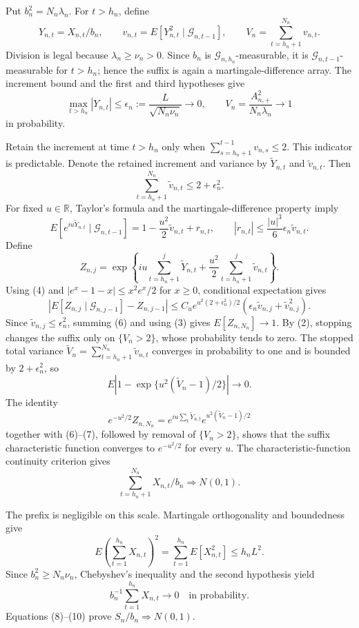 Put \(b_n^2=N_n\lambda_n\).  For \(t>h_n\), define
\[
 Y_{n,t}=X_{n,t}/b_n,\qquad
 v_{n,t}=E[Y_{n,t}^2\mid\mathcal G_{n,t-1}],\qquad
 V_n=\sum_{t=h_n+1}^{N_n}v_{n,t}.
\tag{1}
\]
Division is legal because \(\lambda_n\ge\nu_n>0\).  Since \(b_n\) is \(\mathcal G_{n,h_n}\)-measurable, it is \(\mathcal G_{n,t-1}\)-measurable for \(t>h_n\); hence the suffix is again a martingale-difference array.  The increment bound and the first and third hypotheses give
\[
 \max_{t>h_n}|Y_{n,t}|
 \le\epsilon_n:=\frac{L}{\sqrt{N_n\nu_n}}\longrightarrow0,
 \qquad V_n=\frac{A_{n,+}^2}{N_n\lambda_n}\longrightarrow1
\tag{2}
\]
in probability.

Retain the increment at time \(t>h_n\) only when \(\sum_{s=h_n+1}^{t-1}v_{n,s}\le2\).  This indicator is predictable.  Denote the retained increment and variance by \(\widetilde Y_{n,t}\) and \(\widetilde v_{n,t}\).  Then
\[
 \sum_{t=h_n+1}^{N_n}\widetilde v_{n,t}\le2+\epsilon_n^2.
\tag{3}
\]
For fixed \(u\in\mathbb R\), Taylor's formula and the martingale-difference property imply
\[
 E[e^{iu\widetilde Y_{n,t}}\mid\mathcal G_{n,t-1}]
 =1-\frac{u^2}{2}\widetilde v_{n,t}+r_{n,t},
 \qquad |r_{n,t}|\le\frac{|u|^3}{6}\epsilon_n\widetilde v_{n,t}.
\tag{4}
\]
Define
\[
 Z_{n,j}=\exp\!\left\{iu\sum_{t=h_n+1}^j\widetilde Y_{n,t}
 +\frac{u^2}{2}\sum_{t=h_n+1}^j\widetilde v_{n,t}\right\}.
\tag{5}
\]
Using (4) and \(|e^x-1-x|\le x^2e^x/2\) for \(x\ge0\), conditional expectation gives
\[
 \left|E[Z_{n,j}\mid\mathcal G_{n,j-1}]-Z_{n,j-1}\right|
 \le C_u e^{u^2(2+\epsilon_n^2)/2}
 \left(\epsilon_n\widetilde v_{n,j}+\widetilde v_{n,j}^2\right).
\tag{6}
\]
Since \(\widetilde v_{n,j}\le\epsilon_n^2\), summing (6) and using (3) gives \(E[Z_{n,N_n}]\to1\).  By (2), stopping changes the suffix only on \(\{V_n>2\}\), whose probability tends to zero.  The stopped total variance \(\widetilde V_n=\sum_{t=h_n+1}^{N_n}\widetilde v_{n,t}\) converges in probability to one and is bounded by \(2+\epsilon_n^2\), so
\[
 E\left|1-\exp\{u^2(\widetilde V_n-1)/2\}\right|\longrightarrow0.
\tag{7}
\]
The identity
\[
 e^{-u^2/2}Z_{n,N_n}
 =e^{iu\sum_t\widetilde Y_{n,t}}
 e^{u^2(\widetilde V_n-1)/2}
\]
together with (6)--(7), followed by removal of \(\{V_n>2\}\), shows that the suffix characteristic function converges to \(e^{-u^2/2}\) for every \(u\).  The characteristic-function continuity criterion gives
\[
 \sum_{t=h_n+1}^{N_n}X_{n,t}/b_n\Rightarrow N(0,1).
\tag{8}
\]

The prefix is negligible on this scale.  Martingale orthogonality and boundedness give
\[
 E\left(\sum_{t=1}^{h_n}X_{n,t}\right)^2
 =\sum_{t=1}^{h_n}E[X_{n,t}^2]\le h_nL^2.
\tag{9}
\]
Since \(b_n^2\ge N_n\nu_n\), Chebyshev's inequality and the second hypothesis yield
\[
 b_n^{-1}\sum_{t=1}^{h_n}X_{n,t}\longrightarrow0
 \quad\text{in probability}.
\tag{10}
\]
Equations (8)--(10) prove \(S_n/b_n\Rightarrow N(0,1)\).

